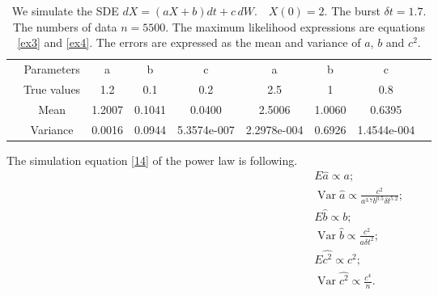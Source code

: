 \documentclass[12pt,reqno, a4paper]{article}
\numberwithin{equation}{section}
\begin{document}
\begin{table}[htbp]
  \caption{\label{tab1} We simulate the \textsc{SDE}
$
dX=(aX+b)dt+c\,dW. \quad  X(0)=2.
$  The burst  $\delta t=1.7$. The numbers of data $n=5500$. The maximum likelihood expressions are equations \eqref{ex3} and \eqref{ex4}. The errors are expressed as the mean  and variance of  $a$, $b$ and $c^2$. }
 \begin{tabular}{ccccccccc}
  \toprule
  &Parameters & a & b &  c & a& b & c\\
  &  True values  &1.2& 0.1 &0.2 & 2.5&1 &0.8 \\
  \midrule
&Mean& 1.2007 & 0.1041&  0.0400& 2.5006& 1.0060& 0.6395 \\
& Variance &  0.0016& 0.0944 & 5.3574e-007 & 2.2978e-004 &  0.6926& 1.4544e-004 \\
  \bottomrule
 \end{tabular}

\end{table}


The simulation equation \eqref{14} of the power law is following.
 \begin{align*}&E\hat{a}\propto a;\\
 &\operatorname{Var}\hat{a}\propto \frac {c^2}{a^{3.7}b^{0.5}\delta t^{5.2}};\\
&E\hat{b}\propto b;\\
 &\operatorname{Var}\hat{b}\propto \frac {c^2}{a\delta t^{2}};\\
& E\hat{c^2}\propto c^2;\\
 &\operatorname{Var}\hat{c^2}\propto \frac {c^4}{n}.\\
 \end{align*}
\end{document}
